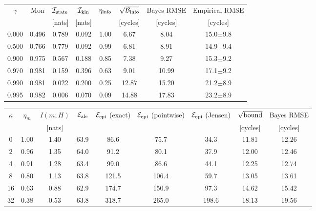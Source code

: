 \begin{tabular}{c c c c c c c c}
\hline
$\gamma$ & $\mathrm{Mon}$ & $\mathcal{I}_{\rm state}$ & $\mathcal{I}_{\rm kin}$ & $\eta_{\rm info}$ & $\sqrt{\mathcal{B}_{\rm info}}$ & Bayes RMSE & Empirical RMSE \\
 & & [nats] & [nats] & & [cycles] & [cycles] & [cycles] \\
\hline
0.000 & 0.496 & 0.789 & 0.092 & 1.00 & 6.67 & 8.04 & 15.0$\pm$9.8 \\
0.500 & 0.766 & 0.779 & 0.092 & 0.99 & 6.81 & 8.91 & 14.9$\pm$9.4 \\
0.900 & 0.975 & 0.567 & 0.188 & 0.85 & 7.38 & 9.27 & 15.3$\pm$9.2 \\
0.970 & 0.981 & 0.159 & 0.396 & 0.63 & 9.01 & 10.99 & 17.1$\pm$9.2 \\
0.990 & 0.981 & 0.022 & 0.200 & 0.25 & 12.87 & 15.20 & 21.2$\pm$8.9 \\
0.995 & 0.982 & 0.006 & 0.070 & 0.09 & 14.88 & 17.83 & 23.2$\pm$8.9 \\
\hline
\end{tabular}
\begin{tabular}{c c c c c c c c c}
\hline
$\kappa$ & $\eta_m$ & $I(m;H)$ & $\mathcal{E}_{\rm ale}$ & $\mathcal{E}_{\rm epi}$ (exact) & $\mathcal{E}_{\rm epi}$ (pointwise) & $\mathcal{E}_{\rm epi}$ (Jensen) & $\sqrt{\rm bound}$ & Bayes RMSE \\
 & & [nats] & & & & & [cycles] & [cycles] \\
\hline
0 & 1.00 & 1.40 & 63.9 & 86.6 & 75.7 & 34.3 & 11.81 & 12.26 \\
2 & 0.96 & 1.35 & 64.0 & 91.2 & 80.1 & 37.9 & 12.00 & 12.46 \\
4 & 0.91 & 1.28 & 63.4 & 99.0 & 86.6 & 44.1 & 12.25 & 12.74 \\
8 & 0.80 & 1.13 & 63.8 & 121.5 & 106.4 & 59.7 & 13.05 & 13.61 \\
16 & 0.63 & 0.88 & 62.9 & 174.7 & 150.9 & 97.3 & 14.62 & 15.42 \\
32 & 0.38 & 0.53 & 63.8 & 318.7 & 265.0 & 198.6 & 18.13 & 19.56 \\
\hline
\end{tabular}
